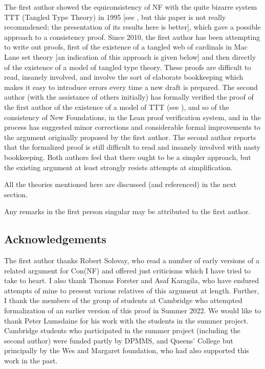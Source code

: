\documentclass[112pt]{article}
\theoremstyle{definition}
\theoremstyle{remark}
\begin{document}
The first author showed the equiconsistency of NF with the quite bizarre system TTT (Tangled Type Theory) in 1995 [see \cite{tangled}, but this paper is not really recommdened; the presentation of its results here is better], which gave a possible approach to a consistency proof.  Since 2010, the first author has been attempting to write out proofs, first of the existence of a tangled web of cardinals in Mac Lane set theory [an indication of this approach is given below] and then directly of the existence of a model of tangled type theory.  These proofs are difficult to read, insanely involved, and involve the sort of elaborate bookkeeping which makes it easy to introduce errors every time a new draft is prepared.  The second author (with the assistance of others initially)
has formally verified the proof of the first author of the existence of a model of TTT (see \cite{wilshaw}), and so of the consistency of New Foundations, in the Lean proof verification system, and in the process has suggested minor corrections and considerable formal improvements to the argument originally proposed by the first author.  The second author reports that the formalized proof is still difficult to read and insanely involved with nasty bookkeeping.  Both authors feel that there ought to be a simpler approach, but the existing argument at least strongly resists attempts at simplification.

All the theories mentioned here are discussed (and referenced) in the next section.

Any remarks in the first person singular may be attributed to the first author.

\subsection{Acknowledgements}

The first author thanks Robert Solovay, who read a number of early versions of a related argument for Con(NF) and offered just criticisms which I have tried to take to heart.  I also thank Thomas Forster and Asaf Karagila, who have endured attempts of mine to present various relatives of this argument at length.  Further, I thank the members of the group of students at Cambridge who attempted formalization of an earlier version of this proof in Summer 2022.  We would like to thank Peter Lumsdaine for his work with the students in the summer project.   Cambridge students who participated in the summer project (including the second author) were funded partly by DPMMS, and Queens' College but principally by the Wes and Margaret foundation, who had also supported this work in the past.
\end{document}
